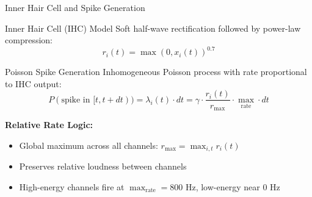 \documentclass[aspectratio=169,20pt]{beamer}
\begin{document}
\begin{frame}{Inner Hair Cell and Spike Generation}
\begin{block}{Inner Hair Cell (IHC) Model}
Soft half-wave rectification followed by power-law compression:
\begin{equation}
r_i(t) = \max(0, x_i(t))^{0.7}
\end{equation}
\end{block}

\vspace{-0.5cm}
\begin{block}{Poisson Spike Generation}
Inhomogeneous Poisson process with rate proportional to IHC output:
\begin{equation}
P(\text{spike in } [t, t+dt)) = \lambda_i(t) \cdot dt = \gamma \cdot \frac{r_i(t)}{r_{\max}} \cdot \max_{\text{rate}} \cdot dt
\end{equation}
\end{block}

\vspace{-0.4cm}
\textbf{Relative Rate Logic:}
\begin{itemize}
    \item Global maximum across all channels: $r_{\max} = \max_{i,t} r_i(t)$
    \item Preserves relative loudness between channels
    \item High-energy channels fire at $\max_{\text{rate}} = 800 \text{ Hz}$, low-energy near 0 Hz
\end{itemize}
\end{frame}
\end{document}
